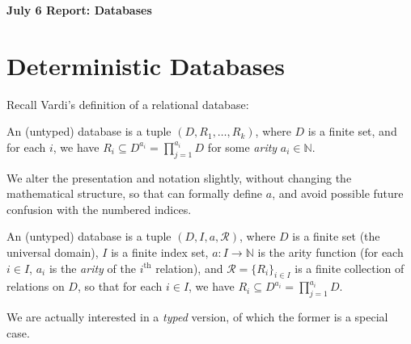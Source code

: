 \documentclass{article}
\theoremstyle{plain}
\theoremstyle{definition}
\theoremstyle{remark}
\begin{document}
	\begin{center}
		\bf\Large July 6 Report: Databases
	\end{center}
	\medskip
	
	
	
	
	\section{Deterministic Databases}
	Recall Vardi's \cite{vardi} definition of a relational database:
	\begin{leftbar}	
	\begin{defn*}
		An (untyped) database is a tuple $(D, R_1, \ldots, R_k)$, where $D$ is a finite set, and for each $i$, we have $R_i \subseteq D^{a_i} = \prod_{j =1}^{a_i} D$ 
		for some \emph{arity} $a_i \in \mathbb N$. 
	\end{defn*}
	\end{leftbar}

	We alter the presentation and notation slightly, without changing the mathematical structure, so that can formally define $a$, and avoid possible future confusion with the numbered indices. 

	\begin{defn}
		An (untyped) database is a tuple $(D, I, a, \mathcal R)$, where $D$ is a finite set (the universal domain), $I$ is a finite index set, $a: I \to \mathbb N$ is the arity function (for each $i \in I$, $a_i$ is the \emph{arity} of the $i^{\text{th}}$ relation), and $\mathcal R = \{R_i\}_{i \in I}$ is a finite collection of relations on $D$, so that for each $i \in I$, we have $R_i \subseteq D^{a_i} = \prod_{j =1}^{a_i} D$.
	\end{defn}

 	We are actually interested in a \emph{typed} version, of which the former is a special case.
	
\end{document}
